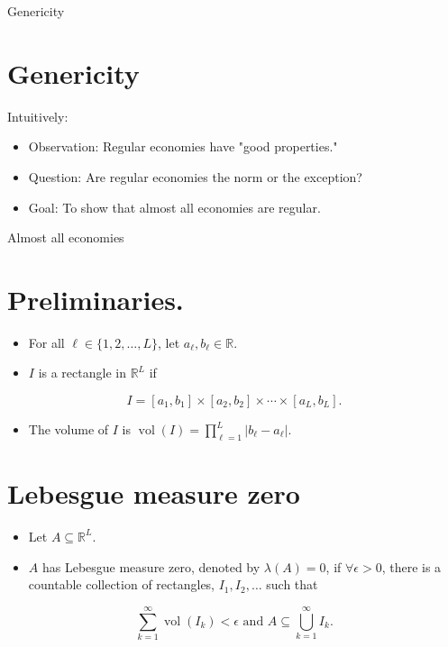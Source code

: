 \documentclass[10pt]{article}
\begin{document}
Genericity

\section*{Genericity}
Intuitively:

\begin{itemize}
  \item Observation: Regular economies have "good properties."
  \item Question: Are regular economies the norm or the exception?
  \item Goal: To show that almost all economies are regular.
\end{itemize}

Almost all economies

\section*{Preliminaries.}
\begin{itemize}
  \item For all $\ell \in\{1,2, \ldots, L\}$, let $a_{\ell}, b_{\ell} \in \mathbb{R}$.
  \item $I$ is a rectangle in $\mathbb{R}^{L}$ if
\end{itemize}

$$
I=\left[a_{1}, b_{1}\right] \times\left[a_{2}, b_{2}\right] \times \cdots \times\left[a_{L}, b_{L}\right] .
$$

\begin{itemize}
  \item The volume of $I$ is $\operatorname{vol}(I)=\prod_{\ell=1}^{L}\left|b_{\ell}-a_{\ell}\right|$.
\end{itemize}

\section*{Lebesgue measure zero}
\begin{itemize}
  \item Let $A \subseteq \mathbb{R}^{L}$.
  \item $A$ has Lebesgue measure zero, denoted by $\lambda(A)=0$, if $\forall \epsilon>0$, there is a countable collection of rectangles, $I_{1}, I_{2}, \ldots$ such that
\end{itemize}

$$
\sum_{k=1}^{\infty} \operatorname{vol}\left(I_{k}\right)<\epsilon \text { and } A \subseteq \bigcup_{k=1}^{\infty} I_{k} .
$$
\end{document}
